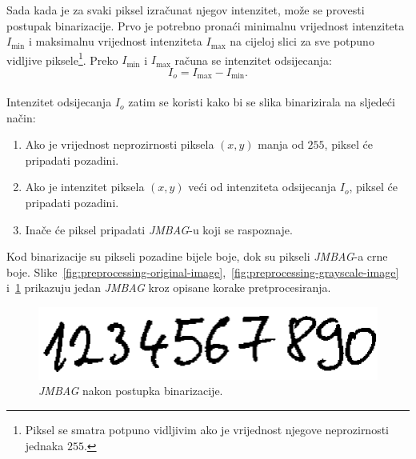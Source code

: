 Sada kada je za svaki piksel izračunat njegov intenzitet, može se provesti postupak binarizacije. Prvo je potrebno
pronaći minimalnu vrijednost intenziteta $I_{\min}$ i maksimalnu vrijednost intenziteta $I_{\max}$ na cijeloj slici za
sve potpuno vidljive piksele\footnote{Piksel se smatra potpuno vidljivim ako je vrijednost njegove neprozirnosti
jednaka $255$.}. Preko $I_{\min}$ i $I_{\max}$ računa se intenzitet odsijecanja:\\
\begin{equation*}
    I_{o} = I_{\max} - I_{\min}.
\end{equation*}\\
Intenzitet odsijecanja $I_{o}$ zatim se koristi kako bi se slika binarizirala na sljedeći način:
\begin{enumerate}
    \item Ako je vrijednost neprozirnosti piksela $(x, y)$ manja od $255$, piksel će pripadati pozadini.
    \item Ako je intenzitet piksela $(x, y)$ veći od intenziteta odsijecanja $I_{o}$, piksel će pripadati pozadini.
    \item Inače će piksel pripadati \emph{JMBAG}-u koji se raspoznaje.
\end{enumerate}
Kod binarizacije su pikseli pozadine bijele boje, dok su pikseli \emph{JMBAG}-a crne boje.
Slike\ \ref{fig:preprocessing-original-image},\ \ref{fig:preprocessing-grayscale-image}
i\ \ref{fig:preprocessing-binarized-image} prikazuju jedan \emph{JMBAG} kroz opisane korake pretprocesiranja.
\begin{figure}[htb]
    \centering
    \includegraphics[width=12cm]{images/preprocessing-binarized-image.png}
    \caption{\emph{JMBAG} nakon postupka binarizacije.}
    \label{fig:preprocessing-binarized-image}
\end{figure}



